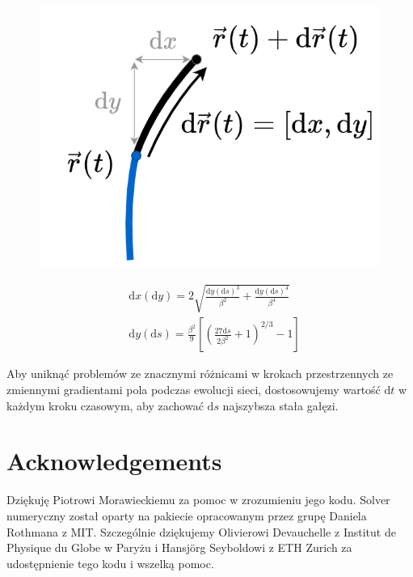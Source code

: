 \documentclass[]{pracamgr}
\begin{document}
      \begin{figure}[h]
        \centering
        \begin{minipage}{0.25\textwidth}
          \centering
          \includegraphics[width=\textwidth, trim={0 0 285 0},clip]{figs/growth.png}
        \end{minipage}
        \hspace{-40pt}
        \begin{minipage}{0.6\textwidth}
          \begin{align}
            \label{x_growth}
            & \textrm{d}x(\textrm{d}y)=2\sqrt{\frac{\textrm{d}y(\textrm{d}s)^3}{\beta^2}+\frac{\textrm{d}y(\textrm{d}s)^4}{\beta^4}}\\
            \label{y_growth}
            & \textrm{d}y(\textrm{d}s)=\frac{\beta^2}{9}\left[\left(\frac{27 \textrm{d}s}{2 \beta ^2}+1\right)^{2/3} - 1 \right]
          \end{align}
        \end{minipage}
        \vspace{0pt}
      \end{figure}

      Aby uniknąć problemów ze znacznymi różnicami w krokach przestrzennych ze zmiennymi gradientami pola podczas ewolucji sieci, dostosowujemy wartość $\textrm{d}t$ w każdym kroku czasowym, aby zachować $\textrm{d}s$ najszybsza stała gałęzi.

  \section*{Acknowledgements}
    Dziękuję Piotrowi Morawieckiemu za pomoc w zrozumieniu jego kodu. Solver numeryczny został oparty na pakiecie opracowanym przez grupę Daniela Rothmana z MIT. Szczególnie dziękujemy Olivierowi Devauchelle z Institut de Physique du Globe w Paryżu i Hansj\"{o}rg Seyboldowi z ETH Zurich za udostępnienie tego kodu i wszelką pomoc.
\end{document}
